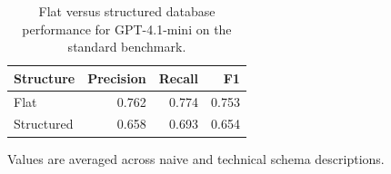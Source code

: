 \begin{table}[htbp]
\centering
\small
\caption{Flat versus structured database performance for GPT-4.1-mini on the standard benchmark.}
\label{tab:flat-structured-gpt41mini}
\begin{tabular}{lrrr}
\toprule
Structure & Precision & Recall & F1 \\
\midrule
Flat & 0.762 & 0.774 & 0.753 \\
Structured & 0.658 & 0.693 & 0.654 \\
\bottomrule
\end{tabular}
\par\footnotesize{Values are averaged across naive and technical schema descriptions.}
\end{table}
